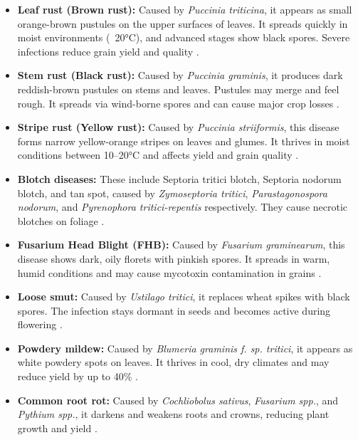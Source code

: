 \begin{itemize}
    \item \textbf{Leaf rust (Brown rust):} Caused by \textit{Puccinia triticina}, it appears as small orange-brown pustules on the upper surfaces of leaves. It spreads quickly in moist environments (~20°C), and advanced stages show black spores. Severe infections reduce grain yield and quality \parencite{duveiller2012wheat}.

    \item \textbf{Stem rust (Black rust):} Caused by \textit{Puccinia graminis}, it produces dark reddish-brown pustules on stems and leaves. Pustules may merge and feel rough. It spreads via wind-borne spores and can cause major crop losses \parencite{duveiller2012wheat}.

    \item \textbf{Stripe rust (Yellow rust):} Caused by \textit{Puccinia striiformis}, this disease forms narrow yellow-orange stripes on leaves and glumes. It thrives in moist conditions between 10–20°C and affects yield and grain quality \parencite{duveiller2012wheat}.

    \item \textbf{Blotch diseases:} These include Septoria tritici blotch, Septoria nodorum blotch, and tan spot, caused by \textit{Zymoseptoria tritici}, \textit{Parastagonospora nodorum}, and \textit{Pyrenophora tritici-repentis} respectively. They cause necrotic blotches on foliage \parencite{figueroa2018review}.

    \item \textbf{Fusarium Head Blight (FHB):} Caused by \textit{Fusarium graminearum}, this disease shows dark, oily florets with pinkish spores. It spreads in warm, humid conditions and may cause mycotoxin contamination in grains \parencite{duveiller2012wheat, figueroa2018review}.

    \item \textbf{Loose smut:} Caused by \textit{Ustilago tritici}, it replaces wheat spikes with black spores. The infection stays dormant in seeds and becomes active during flowering \parencite{duveiller2012wheat}.

    \item \textbf{Powdery mildew:} Caused by \textit{Blumeria graminis f. sp. tritici}, it appears as white powdery spots on leaves. It thrives in cool, dry climates and may reduce yield by up to 40\% \parencite{singh2023wheat}.

    \item \textbf{Common root rot:} Caused by \textit{Cochliobolus sativus}, \textit{Fusarium spp.}, and \textit{Pythium spp.}, it darkens and weakens roots and crowns, reducing plant growth and yield \parencite{duveiller2012wheat}.
\end{itemize}

